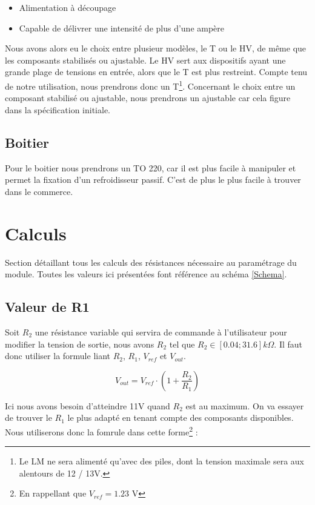 \documentclass[12pt]{article}
\begin{document}
\begin{itemize}
	\item Alimentation à découpage
	\item Capable de délivrer une intensité de plus d'une ampère
\end{itemize}

Nous avons alors eu le choix entre plusieur modèles, le T ou le HV, de même que les composants stabilisés ou ajustable.
Le HV sert aux dispositifs ayant une grande plage de tensions en entrée, alors que le T est plus restreint. Compte tenu
de notre utilisation, nous prendrons donc un T\footnote{Le LM ne sera alimenté qu'avec des piles, dont la tension maximale
sera aux alentours de 12 / 13V.}. Concernant le choix entre un composant stabilisé ou ajustable, nous prendrons un ajustable
car cela figure dans la spécification initiale.


\subsection{Boitier}

Pour le boitier nous prendrons un TO 220, car il est plus facile à manipuler et permet la fixation d'un refroidisseur
passif. C'est de plus le plus facile à trouver dans le commerce.




\newpage
\section{Calculs}\label{sectionCalculs}

Section détaillant tous les calculs des résistances nécessaire au paramétrage du module. Toutes les valeurs ici présentées
font référence au schéma \ref{Schema}.

\subsection{Valeur de R1}

Soit $R_2$ une résistance variable qui servira de commande à l'utilisateur pour modifier la tension de sortie, nous
avons $R_2$ tel que $R_2 \in [0.04 ; 31.6]  k\Omega$. Il faut donc utiliser la formule liant $R_2$, $R_1$, $V_{ref}$ et $V_{out}$.

\begin{equation}
	\boxed{V_{out} = V_{ref} \cdot (1 + \frac{R_2}{R_1})}
\end{equation}

Ici nous avons besoin d'atteindre 11V quand $R_2$ est au maximum. On va essayer de trouver le $R_1$ le plus
adapté en tenant compte des composants disponibles.
Nous utiliserons donc la fomrule dans cette forme\footnote{En rappellant que $V_{ref} = 1.23$ V} :
\end{document}
